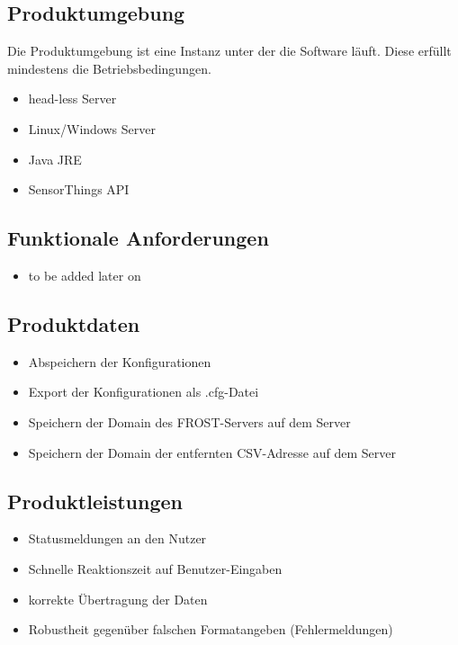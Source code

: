 \documentclass[12 pt]{article}
\begin{document}
\subsection{Produktumgebung}
Die Produktumgebung ist eine Instanz unter der die Software läuft. Diese erfüllt mindestens die Betriebsbedingungen.
\begin{itemize}
\item head-less Server
\item Linux/Windows Server
\item Java JRE
\item SensorThings API
\end{itemize}

\subsection{Funktionale Anforderungen}
\begin{itemize}
\item to be added later on
\end{itemize}


\subsection{Produktdaten}
\begin{itemize}
\item Abspeichern der Konfigurationen
\item Export der Konfigurationen als .cfg-Datei
\item Speichern der Domain des FROST-Servers auf dem Server
\item Speichern der Domain der entfernten CSV-Adresse auf dem Server
\end{itemize}

\subsection{Produktleistungen}
\begin{itemize}
\item Statusmeldungen an den Nutzer
\item Schnelle Reaktionszeit auf Benutzer-Eingaben
\item korrekte Übertragung der Daten
\item Robustheit gegenüber falschen Formatangeben (Fehlermeldungen)
\end{itemize}
\end{document}
